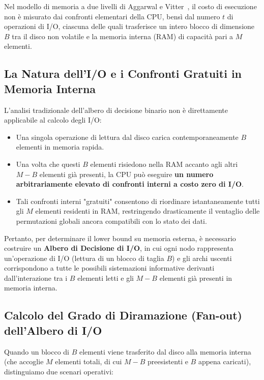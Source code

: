 Nel modello di memoria a due livelli di Aggarwal e Vitter~\cite{aggarwal1988}, il costo di esecuzione non è misurato dai confronti elementari della CPU, bensì dal numero $t$ di operazioni di I/O, ciascuna delle quali trasferisce un intero blocco di dimensione $B$ tra il disco non volatile e la memoria interna (RAM) di capacità pari a $M$ elementi.

\subsection{La Natura dell'I/O e i Confronti Gratuiti in Memoria Interna}
\label{subsec:free-comparisons-intuition}

L'analisi tradizionale dell'albero di decisione binario non è direttamente applicabile al calcolo degli I/O:
\begin{itemize}
  \item Una singola operazione di lettura dal disco carica contemporaneamente $B$ elementi in memoria rapida.
  \item Una volta che questi $B$ elementi risiedono nella RAM accanto agli altri $M - B$ elementi già presenti, la CPU può eseguire \textbf{un numero arbitrariamente elevato di confronti interni a costo zero di I/O}.
  \item Tali confronti interni "gratuiti" consentono di riordinare istantaneamente tutti gli $M$ elementi residenti in RAM, restringendo drasticamente il ventaglio delle permutazioni globali ancora compatibili con lo stato dei dati.
\end{itemize}

Pertanto, per determinare il lower bound su memoria esterna, è necessario costruire un \textbf{Albero di Decisione di I/O}, in cui ogni nodo rappresenta un'operazione di I/O (lettura di un blocco di taglia $B$) e gli archi uscenti corrispondono a tutte le possibili sistemazioni informative derivanti dall'interazione tra i $B$ elementi letti e gli $M - B$ elementi già presenti in memoria interna.

\subsection{Calcolo del Grado di Diramazione (Fan-out) dell'Albero di I/O}
\label{subsec:fanout-calculation}

Quando un blocco di $B$ elementi viene trasferito dal disco alla memoria interna (che accoglie $M$ elementi totali, di cui $M - B$ preesistenti e $B$ appena caricati), distinguiamo due scenari operativi:

